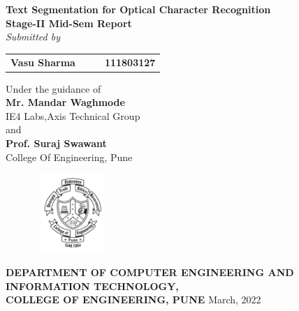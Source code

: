 \begin{titlepage}
\begin{center}
\LARGE{\bf{Text Segmentation for Optical Character Recognition\\}}	%
\vspace{10pt}
\Large{\bf{Stage-II Mid-Sem Report\\}}	
\vspace{15pt}	%
\Large{\em{Submitted by\\}}
\vspace{10pt}
\begin{table}[htbp]
	\begin{center}
	\begin{tabular}{ l c c l }
	\Large\bf{Vasu Sharma} & & & \Large\bf{111803127} \\[0.1cm] 

	\end{tabular}
	\end{center}
	\end{table}

\vspace{20pt}
\Large{Under the guidance of\\ }
\vspace{10pt}
\Large{\bf{Mr. Mandar Waghmode } \\}
\vspace{10pt}
\Large{IE4 Labs,Axis Technical Group\\}
\vspace{10pt}
\large{and\\}
\Large{\bf{Prof. Suraj Swawant } \\}
\vspace{10pt}
\Large{College Of Engineering, Pune\\}

\vspace{30pt}

\begin{figure}[h]
\centering
\includegraphics[width=3cm,height=3cm]{coepNewLogo.png}
\end{figure}
\vspace{10pt}
\Large{\bf{DEPARTMENT OF COMPUTER ENGINEERING AND \\INFORMATION TECHNOLOGY,\\ 
COLLEGE OF ENGINEERING, PUNE}}
\vfill
\large{March, 2022}
\end{center}
\end{titlepage}
